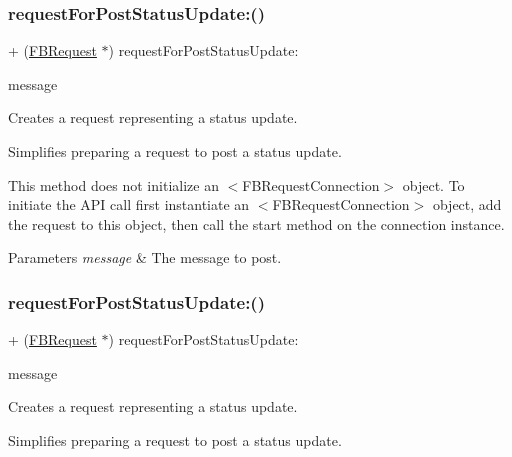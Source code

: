 \subsubsection{\texorpdfstring{request\+For\+Post\+Status\+Update\+:()}{requestForPostStatusUpdate:()}\hspace{0.1cm}{\footnotesize\ttfamily [1/5]}}
{\footnotesize\ttfamily + (\hyperlink{interfaceFBRequest}{F\+B\+Request} $\ast$) request\+For\+Post\+Status\+Update\+: \begin{DoxyParamCaption}\item[{(N\+S\+String $\ast$)}]{message }\end{DoxyParamCaption}}

Creates a request representing a status update.

Simplifies preparing a request to post a status update.

This method does not initialize an $<$\+F\+B\+Request\+Connection$>$ object. To initiate the A\+PI call first instantiate an $<$\+F\+B\+Request\+Connection$>$ object, add the request to this object, then call the {\ttfamily start} method on the connection instance.


\begin{DoxyParams}{Parameters}
{\em message} & The message to post. \\
\hline
\end{DoxyParams}
\mbox{\label{interfaceFBRequest_a0a745a53f4764835bd0945bd66fe10fd}} 
\subsubsection{\texorpdfstring{request\+For\+Post\+Status\+Update\+:()}{requestForPostStatusUpdate:()}\hspace{0.1cm}{\footnotesize\ttfamily [2/5]}}
{\footnotesize\ttfamily + (\hyperlink{interfaceFBRequest}{F\+B\+Request} $\ast$) request\+For\+Post\+Status\+Update\+: \begin{DoxyParamCaption}\item[{(N\+S\+String $\ast$)}]{message }\end{DoxyParamCaption}}

Creates a request representing a status update.

Simplifies preparing a request to post a status update.

